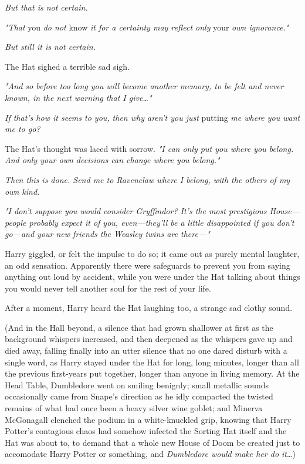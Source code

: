 \emph{But that is not certain.}

\emph{"That} you\emph{ do not} know\emph{ it for a certainty may reflect only} 
your\emph{ own ignorance."}

\emph{But still it is not certain.}

The Hat sighed a terrible sad sigh.

\emph{"And so before too long you will become another memory, to be felt and 
never known, in the next warning that I give{\ldots}"}

\emph{If that's how it seems to you, then why aren't you just} putting\emph{ me 
where you want me to go?}

The Hat's thought was laced with sorrow. \emph{"I can only put you where you 
belong. And only your own decisions can change where you belong."}

\emph{Then this is done. Send me to Ravenclaw where I belong, with the others 
of my own kind.}

\emph{"I don't suppose you would consider Gryffindor? It's the most prestigious 
House---people probably expect it of you, even---they'll be a little 
disappointed if you don't go---and your new friends the Weasley twins are 
there---"}

Harry giggled, or felt the impulse to do so; it came out as purely mental 
laughter, an odd sensation. Apparently there were safeguards to prevent you 
from saying anything out loud by accident, while you were under the Hat talking 
about things you would never tell another soul for the rest of your life.

After a moment, Harry heard the Hat laughing too, a strange sad clothy sound.

(And in the Hall beyond, a silence that had grown shallower at first as the 
background whispers increased, and then deepened as the whispers gave up and 
died away, falling finally into an utter silence that no one dared disturb with 
a single word, as Harry stayed under the Hat for long, long minutes, longer 
than all the previous first-years put together, longer than anyone in living 
memory. At the Head Table, Dumbledore went on smiling benignly; small metallic 
sounds occasionally came from Snape's direction as he idly compacted the 
twisted remains of what had once been a heavy silver wine goblet; and Minerva 
McGonagall clenched the podium in a white-knuckled grip, knowing that Harry 
Potter's contagious chaos had somehow infected the Sorting Hat itself and the 
Hat was about to, to demand that a whole new House of Doom be created just to 
accomodate Harry Potter or something, and \emph{Dumbledore would make her do 
it}{\ldots})

